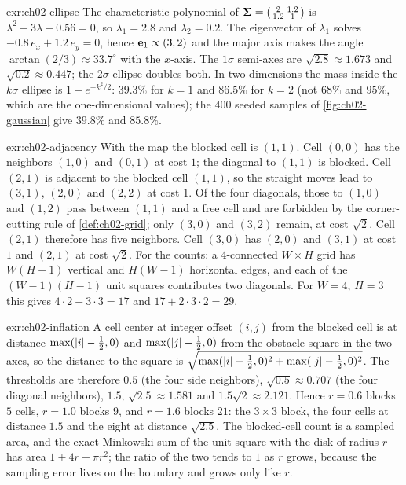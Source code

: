 \begin{solution}{exr:ch02-ellipse}
The characteristic polynomial of $\mathbf{\Sigma}=\begin{psmallmatrix}2&1.2\\1.2&1\end{psmallmatrix}$ is $\lambda^2-3\lambda+0.56=0$, so $\lambda_1=2.8$ and $\lambda_2=0.2$. The eigenvector of $\lambda_1$ solves $-0.8\,e_x+1.2\,e_y=0$, hence $\mathbf{e}_1\propto(3,2)$ and the major axis makes the angle $\arctan(2/3)\approx 33.7^\circ$ with the $x$-axis. The $1\sigma$ semi-axes are $\sqrt{2.8}\approx 1.673$ and $\sqrt{0.2}\approx 0.447$; the $2\sigma$ ellipse doubles both. In two dimensions the mass inside the $k\sigma$ ellipse is $1-e^{-k^2/2}$: $39.3\%$ for $k=1$ and $86.5\%$ for $k=2$ (not $68\%$ and $95\%$, which are the one-dimensional values); the $400$ seeded samples of \cref{fig:ch02-gaussian} give $39.8\%$ and $85.8\%$.
\end{solution}

\begin{solution}{exr:ch02-adjacency}
With the map \code{["....", ".\#..", "...."]} the blocked cell is $(1,1)$. Cell $(0,0)$ has the neighbors $(1,0)$ and $(0,1)$ at cost $1$; the diagonal to $(1,1)$ is blocked. Cell $(2,1)$ is adjacent to the blocked cell $(1,1)$, so the straight moves lead to $(3,1)$, $(2,0)$ and $(2,2)$ at cost $1$. Of the four diagonals, those to $(1,0)$ and $(1,2)$ pass between $(1,1)$ and a free cell and are forbidden by the corner-cutting rule of \cref{def:ch02-grid}; only $(3,0)$ and $(3,2)$ remain, at cost $\sqrt2$. Cell $(2,1)$ therefore has five neighbors. Cell $(3,0)$ has $(2,0)$ and $(3,1)$ at cost $1$ and $(2,1)$ at cost $\sqrt2$. For the counts: a 4-connected $W\times H$ grid has $W(H-1)$ vertical and $H(W-1)$ horizontal edges, and each of the $(W-1)(H-1)$ unit squares contributes two diagonals. For $W=4$, $H=3$ this gives $4\cdot2+3\cdot3=17$ and $17+2\cdot3\cdot2=29$.
\end{solution}

\begin{solution}{exr:ch02-inflation}
A cell center at integer offset $(i,j)$ from the blocked cell is at distance $\max(\left\lvert i \right\rvert-\tfrac12,0)$ and $\max(\left\lvert j \right\rvert-\tfrac12,0)$ from the obstacle square in the two axes, so the distance to the square is $\sqrt{\max(\left\lvert i \right\rvert-\frac12,0)^2+\max(\left\lvert j \right\rvert-\frac12,0)^2}$. The thresholds are therefore $0.5$ (the four side neighbors), $\sqrt{0.5}\approx0.707$ (the four diagonal neighbors), $1.5$, $\sqrt{2.5}\approx1.581$ and $1.5\sqrt2\approx2.121$. Hence $r=0.6$ blocks $5$ cells, $r=1.0$ blocks $9$, and $r=1.6$ blocks $21$: the $3\times3$ block, the four cells at distance $1.5$ and the eight at distance $\sqrt{2.5}$. The blocked-cell count is a sampled area, and the exact Minkowski sum of the unit square with the disk of radius $r$ has area $1+4r+\pi r^2$; the ratio of the two tends to $1$ as $r$ grows, because the sampling error lives on the boundary and grows only like $r$.
\end{solution}

